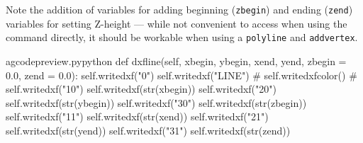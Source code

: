 \documentclass{ltxdoc}
\begin{document}
%

Note the addition of variables for adding beginning (\verb|zbegin|) and ending (\verb|zend|) variables for setting Z-height --- while not convenient to access when using the command directly, it should be workable when using a \verb|polyline| and \verb|addvertex|.


\lstset{firstnumber=\thegcpy}
\begin{writecode}{a}{gcodepreview.py}{python}
    def dxfline(self, xbegin, ybegin, xend, yend, zbegin = 0.0, zend = 0.0):
        self.writedxf("0")
        self.writedxf("LINE")
#
        self.writedxfcolor()
#
        self.writedxf("10")
        self.writedxf(str(xbegin))
        self.writedxf("20")
        self.writedxf(str(ybegin))
        self.writedxf("30")
        self.writedxf(str(zbegin))
        self.writedxf("11")
        self.writedxf(str(xend))
        self.writedxf("21")
        self.writedxf(str(yend))
        self.writedxf("31")
        self.writedxf(str(zend))

\end{writecode}
\addtocounter{gcpy}{19}
\end{document}
